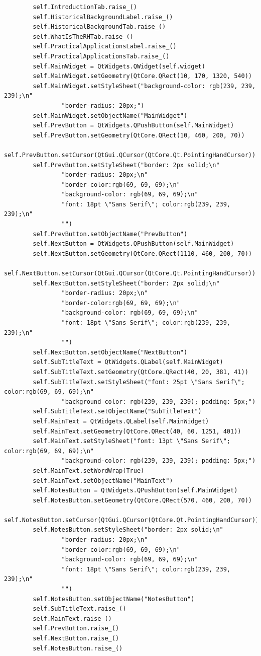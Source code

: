 \documentclass{article}
\begin{document}
\begin{lstlisting}
        self.IntroductionTab.raise_()
        self.HistoricalBackgroundLabel.raise_()
        self.HistoricalBackgroundTab.raise_()
        self.WhatIsTheRHTab.raise_()
        self.PracticalApplicationsLabel.raise_()
        self.PracticalApplicationsTab.raise_()
        self.MainWidget = QtWidgets.QWidget(self.widget)
        self.MainWidget.setGeometry(QtCore.QRect(10, 170, 1320, 540))
        self.MainWidget.setStyleSheet("background-color: rgb(239, 239, 239);\n"
                "border-radius: 20px;")
        self.MainWidget.setObjectName("MainWidget")
        self.PrevButton = QtWidgets.QPushButton(self.MainWidget)
        self.PrevButton.setGeometry(QtCore.QRect(10, 460, 200, 70))
        self.PrevButton.setCursor(QtGui.QCursor(QtCore.Qt.PointingHandCursor))
        self.PrevButton.setStyleSheet("border: 2px solid;\n"
                "border-radius: 20px;\n"
                "border-color:rgb(69, 69, 69);\n"
                "background-color: rgb(69, 69, 69);\n"
                "font: 18pt \"Sans Serif\"; color:rgb(239, 239, 239);\n"
                "")
        self.PrevButton.setObjectName("PrevButton")
        self.NextButton = QtWidgets.QPushButton(self.MainWidget)
        self.NextButton.setGeometry(QtCore.QRect(1110, 460, 200, 70))
        self.NextButton.setCursor(QtGui.QCursor(QtCore.Qt.PointingHandCursor))
        self.NextButton.setStyleSheet("border: 2px solid;\n"
                "border-radius: 20px;\n"
                "border-color:rgb(69, 69, 69);\n"
                "background-color: rgb(69, 69, 69);\n"
                "font: 18pt \"Sans Serif\"; color:rgb(239, 239, 239);\n"
                "")
        self.NextButton.setObjectName("NextButton")
        self.SubTitleText = QtWidgets.QLabel(self.MainWidget)
        self.SubTitleText.setGeometry(QtCore.QRect(40, 20, 381, 41))
        self.SubTitleText.setStyleSheet("font: 25pt \"Sans Serif\"; color:rgb(69, 69, 69);\n"
                "background-color: rgb(239, 239, 239); padding: 5px;")
        self.SubTitleText.setObjectName("SubTitleText")
        self.MainText = QtWidgets.QLabel(self.MainWidget)
        self.MainText.setGeometry(QtCore.QRect(40, 60, 1251, 401))
        self.MainText.setStyleSheet("font: 13pt \"Sans Serif\"; color:rgb(69, 69, 69);\n"
                "background-color: rgb(239, 239, 239); padding: 5px;")
        self.MainText.setWordWrap(True)
        self.MainText.setObjectName("MainText")
        self.NotesButton = QtWidgets.QPushButton(self.MainWidget)
        self.NotesButton.setGeometry(QtCore.QRect(570, 460, 200, 70))
        self.NotesButton.setCursor(QtGui.QCursor(QtCore.Qt.PointingHandCursor))
        self.NotesButton.setStyleSheet("border: 2px solid;\n"
                "border-radius: 20px;\n"
                "border-color:rgb(69, 69, 69);\n"
                "background-color: rgb(69, 69, 69);\n"
                "font: 18pt \"Sans Serif\"; color:rgb(239, 239, 239);\n"
                "")
        self.NotesButton.setObjectName("NotesButton")
        self.SubTitleText.raise_()
        self.MainText.raise_()
        self.PrevButton.raise_()
        self.NextButton.raise_()
        self.NotesButton.raise_()


\end{lstlisting}
\end{document}
